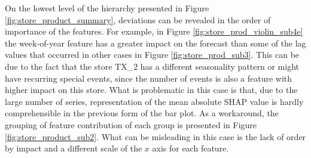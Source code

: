 On the lowest level of the hierarchy presented in Figure \ref{fig:store_product_summary},
deviations can be revealed in the order of importance of the features.
For example, in Figure \ref{fig:store_prod_violin_sub4e} the week-of-year feature has a greater impact
on the forecast than some of the lag values that occurred in other cases in Figure \ref{fig:store_prod_sub3}.
This can be due to the fact that the store TX\_2 has a different seasonality pattern or
might have recurring special events, since the number of events is also a feature with higher impact on this store.
What is problematic in this case is that, due to the large number of series,
representation of the mean absolute SHAP value is hardly comprehensible in the previous form of the bar plot.
As a workaround, the grouping of feature contribution of each group is presented in Figure \ref{fig:store_product_sub2}.
What can be misleading in this case is the lack of order by impact and a different scale of the $x$ axis for each feature.

